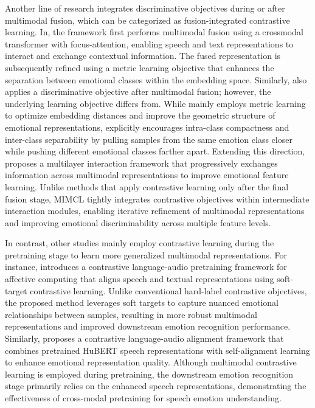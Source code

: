 Another line of research integrates discriminative objectives during or after multimodal fusion, which can be categorized as fusion-integrated contrastive learning. In\cite{Kim2023}, the framework first performs multimodal fusion using a crossmodal transformer with focus-attention, enabling speech and text representations to interact and exchange contextual information. The fused representation is subsequently refined using a metric learning objective that enhances the separation between emotional classes within the embedding space. Similarly,\cite{Shi2024} also applies a discriminative objective after multimodal fusion; however, the underlying learning objective differs from\cite{Kim2023}. While\cite{Kim2023} mainly employs metric learning to optimize embedding distances and improve the geometric structure of emotional representations,\cite{Shi2024} explicitly encourages intra-class compactness and inter-class separability by pulling samples from the same emotion class closer while pushing different emotional classes farther apart. Extending this direction,\cite{Li2025} proposes a multilayer interaction framework that progressively exchanges information across multimodal representations to improve emotional feature learning. Unlike methods that apply contrastive learning only after the final fusion stage, MIMCL tightly integrates contrastive objectives within intermediate interaction modules, enabling iterative refinement of multimodal representations and improving emotional discriminability across multiple feature levels.

In contrast, other studies mainly employ contrastive learning during the pretraining stage to learn more generalized multimodal representations. For instance,\cite{Jing2026} introduces a contrastive language-audio pretraining framework for affective computing that aligns speech and textual representations using soft-target contrastive learning. Unlike conventional hard-label contrastive objectives, the proposed method leverages soft targets to capture nuanced emotional relationships between samples, resulting in more robust multimodal representations and improved downstream emotion recognition performance. Similarly,\cite{Nguyen2024} proposes a contrastive language-audio alignment framework that combines pretrained HuBERT speech representations with self-alignment learning to enhance emotional representation quality. Although multimodal contrastive learning is employed during pretraining, the downstream emotion recognition stage primarily relies on the enhanced speech representations, demonstrating the effectiveness of cross-modal pretraining for speech emotion understanding.


